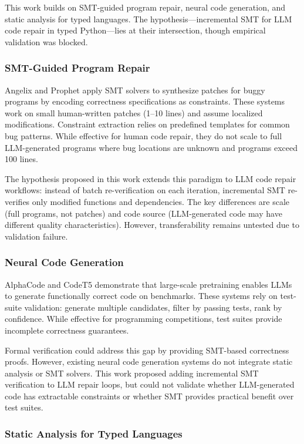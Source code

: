 
This work builds on SMT-guided program repair, neural code generation, and static analysis for typed languages. The hypothesis---incremental SMT for LLM code repair in typed Python---lies at their intersection, though empirical validation was blocked.

\subsubsection{SMT-Guided Program Repair}

Angelix and Prophet apply SMT solvers to synthesize patches for buggy programs by encoding correctness specifications as constraints. These systems work on small human-written patches (1--10 lines) and assume localized modifications. Constraint extraction relies on predefined templates for common bug patterns. While effective for human code repair, they do not scale to full LLM-generated programs where bug locations are unknown and programs exceed 100 lines.

The hypothesis proposed in this work extends this paradigm to LLM code repair workflows: instead of batch re-verification on each iteration, incremental SMT re-verifies only modified functions and dependencies. The key differences are scale (full programs, not patches) and code source (LLM-generated code may have different quality characteristics). However, transferability remains untested due to validation failure.

\subsubsection{Neural Code Generation}

AlphaCode and CodeT5 demonstrate that large-scale pretraining enables LLMs to generate functionally correct code on benchmarks. These systems rely on test-suite validation: generate multiple candidates, filter by passing tests, rank by confidence. While effective for programming competitions, test suites provide incomplete correctness guarantees.

Formal verification could address this gap by providing SMT-based correctness proofs. However, existing neural code generation systems do not integrate static analysis or SMT solvers. This work proposed adding incremental SMT verification to LLM repair loops, but could not validate whether LLM-generated code has extractable constraints or whether SMT provides practical benefit over test suites.

\subsubsection{Static Analysis for Typed Languages}

